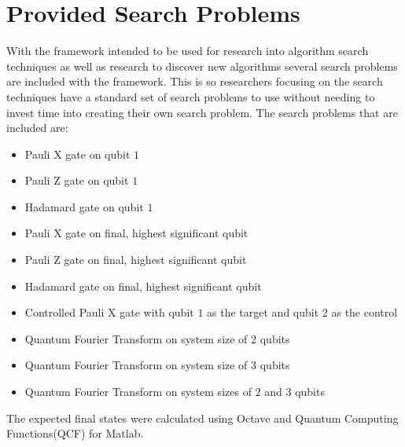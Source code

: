 \section{Provided Search Problems}
\label{sec:provsearchprobs}
With the framework intended to be used for research into algorithm search techniques as well as research to discover new algorithms several search problems are included with the framework.
This is so researchers focusing on the search techniques have a standard set of search problems to use without needing to invest time into creating their own search problem.
The search problems that are included are:
\begin{itemize}
 \item Pauli X gate on qubit $1$
 \item Pauli Z gate on qubit $1$
 \item Hadamard gate on qubit $1$
 \item Pauli X gate on final, highest significant qubit
 \item Pauli Z gate on final, highest significant qubit
 \item Hadamard gate on final, highest significant qubit
 \item Controlled Pauli X gate with qubit $1$ as the target and qubit $2$ as the control
 \item Quantum Fourier Transform on system size of $2$ qubits
 \item Quantum Fourier Transform on system size of $3$ qubits
 \item Quantum Fourier Transform on system sizes of $2$ and $3$ qubits
\end{itemize}

The expected final states were calculated using Octave\cite{octweb} and Quantum Computing Functions(QCF) for Matlab\cite{qcfweb}.

